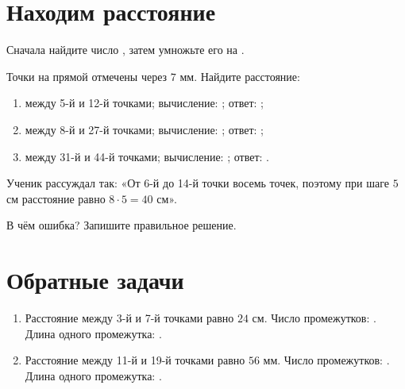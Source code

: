 \section{Находим расстояние}

\begin{fillbox}[Алгоритм]
  Сначала найдите число \answerblank[34mm], затем умножьте его на
  \answerblank[55mm].
\end{fillbox}

\begin{practicebox}
  Точки на прямой отмечены через \(7\) мм. Найдите расстояние:
  \begin{enumerate}[label=\alph*),itemsep=0.65em]
    \item между 5-й и 12-й точками;
      \quad вычисление: \answerblank[60mm]; ответ: \answerblank[28mm];
    \item между 8-й и 27-й точками;
      \quad вычисление: \answerblank[60mm]; ответ: \answerblank[28mm];
    \item между 31-й и 44-й точками;
      \quad вычисление: \answerblank[60mm]; ответ: \answerblank[28mm].
  \end{enumerate}
\end{practicebox}

\clearpage
\begin{thinkbox}
  Ученик рассуждал так: «От 6-й до 14-й точки восемь точек, поэтому при шаге
  \(5\) см расстояние равно \(8\cdot5=40\) см».

  В чём ошибка? Запишите правильное решение.
\end{thinkbox}

\section{Обратные задачи}

\reverseexamplefigure

\begin{practicebox}
  \begin{enumerate}[label=\alph*),itemsep=0.75em]
    \item Расстояние между 3-й и 7-й точками равно \(24\) см.
      \newline Число промежутков: \answerblank[25mm].
      Длина одного промежутка: \answerblank[45mm].
    \item Расстояние между 11-й и 19-й точками равно \(56\) мм.
      \newline Число промежутков: \answerblank[25mm].
      Длина одного промежутка: \answerblank[45mm].
  \end{enumerate}
\end{practicebox}

